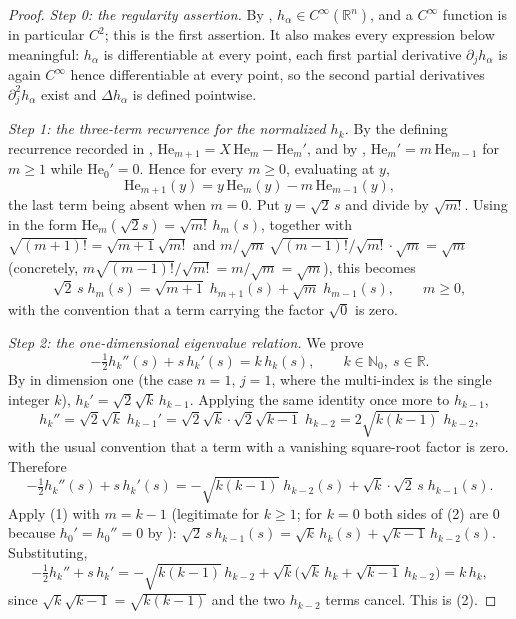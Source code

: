 \begin{proof}
\emph{Step 0: the regularity assertion.}
By , $h_\alpha \in C^\infty(\mathbb{R}^n)$, and a
$C^\infty$ function is in particular $C^2$; this is the first assertion.  It also
makes every expression below meaningful: $h_\alpha$ is differentiable at every
point, each first partial derivative $\partial_j h_\alpha$ is again $C^\infty$
hence differentiable at every point, so the second partial derivatives
$\partial_j^2 h_\alpha$ exist and $\Delta h_\alpha$ is defined pointwise.

\emph{Step 1: the three-term recurrence for the normalized $h_k$.}
By the defining recurrence recorded in ,
$\mathrm{He}_{m+1} = X\,\mathrm{He}_m - \mathrm{He}_m'$, and by ,
$\mathrm{He}_m' = m\,\mathrm{He}_{m-1}$ for $m \geq 1$ while $\mathrm{He}_0' = 0$.  Hence for
every $m \geq 0$, evaluating at $y$,
\[
  \mathrm{He}_{m+1}(y) = y\,\mathrm{He}_m(y) - m\,\mathrm{He}_{m-1}(y),
\]
the last term being absent when $m = 0$.  Put $y = \sqrt2\,s$ and divide by
$\sqrt{m!}$.  Using  in the form
$\mathrm{He}_m(\sqrt2 s) = \sqrt{m!}\, h_m(s)$, together with
$\sqrt{(m+1)!} = \sqrt{m+1}\sqrt{m!}$ and
$m/\sqrt{m}\,\sqrt{(m-1)!}/\sqrt{m!}\cdot\sqrt{m} = \sqrt m$ (concretely,
$m\sqrt{(m-1)!}/\sqrt{m!} = m/\sqrt{m} = \sqrt{m}$), this becomes
\begin{equation*}
  \sqrt{2}\, s\; h_m(s) = \sqrt{m+1}\; h_{m+1}(s) + \sqrt{m}\; h_{m-1}(s),
  \qquad m \geq 0, \tag{1}
\end{equation*}
with the convention that a term carrying the factor $\sqrt{0}$ is zero.

\emph{Step 2: the one-dimensional eigenvalue relation.}
We prove
\begin{equation*}
  -\tfrac12 h_k''(s) + s\, h_k'(s) = k\, h_k(s),
  \qquad k \in \mathbb{N}_0,\ s \in \mathbb{R}. \tag{2}
\end{equation*}
By  in dimension one (the case $n = 1$, $j = 1$, where
the multi-index is the single integer $k$),
$h_k' = \sqrt2\sqrt{k}\, h_{k-1}$.  Applying the same identity once more to
$h_{k-1}$,
\[
  h_k'' = \sqrt2\sqrt{k}\; h_{k-1}'
        = \sqrt2\sqrt{k}\cdot\sqrt2\sqrt{k-1}\; h_{k-2}
        = 2\sqrt{k(k-1)}\; h_{k-2},
\]
with the usual convention that a term with a vanishing square-root factor is
zero.  Therefore
\[
  -\tfrac12 h_k''(s) + s\,h_k'(s)
    = -\sqrt{k(k-1)}\; h_{k-2}(s) + \sqrt{k}\cdot\sqrt2\, s\; h_{k-1}(s) .
\]
Apply (1) with $m = k-1$ (legitimate for $k \geq 1$; for $k = 0$ both sides of
(2) are $0$ because $h_0' = h_0'' = 0$ by ):
$\sqrt2\,s\,h_{k-1}(s) = \sqrt{k}\,h_k(s) + \sqrt{k-1}\,h_{k-2}(s)$.  Substituting,
\[
  -\tfrac12 h_k'' + s\,h_k'
    = -\sqrt{k(k-1)}\, h_{k-2}
      + \sqrt{k}\bigl(\sqrt{k}\, h_k + \sqrt{k-1}\, h_{k-2}\bigr)
    = k\, h_k ,
\]
since $\sqrt{k}\sqrt{k-1} = \sqrt{k(k-1)}$ and the two $h_{k-2}$ terms cancel.
This is (2).


\end{proof}
